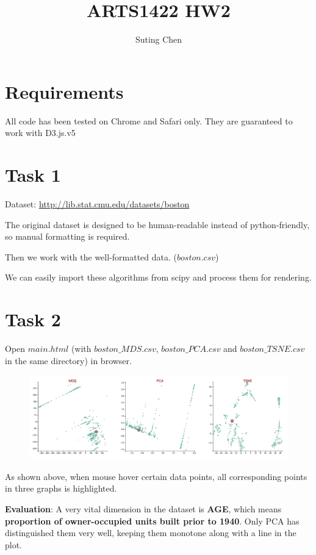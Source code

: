 \documentclass[]{article}
\title{ARTS1422 HW2}
\author{Suting Chen}
\begin{document}
    \maketitle


    \section{Requirements}
    All code has been tested on Chrome and Safari only. They are guaranteed to work with D3.js.v5


    \section{Task 1}
    Dataset: \underline{http://lib.stat.cmu.edu/datasets/boston}
    
    The original dataset is designed to be human-readable instead of python-friendly, so manual formatting is required.
    
    Then we work with the well-formatted data. ($boston.csv$)
    
    We can easily import these algorithms from scipy and process them for rendering.
    \newpage


    \section{Task 2}
    
    Open $main.html$ (with $boston\_MDS.csv$, $boston\_PCA.csv$ and $boston\_TSNE.csv$ in the same directory) in browser.
    
    \begin{figure}[h]
    	\centering
    	\includegraphics[width=14cm]{task2}
    	\label{fig:task2}
    \end{figure}
    
    As shown above, when mouse hover certain data points, all corresponding points in three graphs is highlighted.
    
    \hspace{3cm}

	\textbf{Evaluation}: A very vital dimension in the dataset is \textbf{AGE}, which means \textbf{proportion of owner-occupied units built prior to 1940}. Only PCA has distinguished them very well, keeping them monotone along with a line in the plot.
\end{document}
